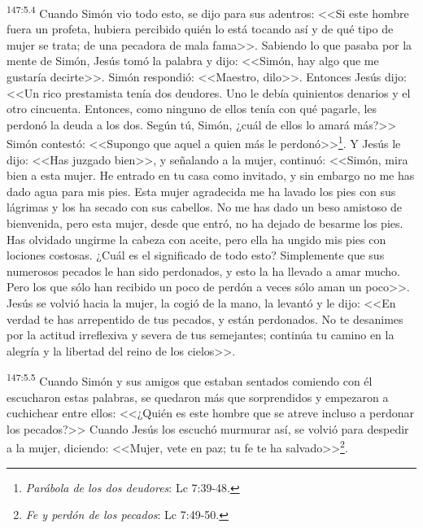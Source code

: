 \par 
\textsuperscript{147:5.4} Cuando Simón vio todo esto, se dijo para sus adentros: <<Si este hombre fuera un profeta, hubiera percibido quién lo está tocando así y de qué tipo de mujer se trata; de una pecadora de mala fama>>. Sabiendo lo que pasaba por la mente de Simón, Jesús tomó la palabra y dijo: <<Simón, hay algo que me gustaría decirte>>. Simón respondió: <<Maestro, dilo>>. Entonces Jesús dijo: <<Un rico prestamista tenía dos deudores. Uno le debía quinientos denarios y el otro cincuenta. Entonces, como ninguno de ellos tenía con qué pagarle, les perdonó la deuda a los dos. Según tú, Simón, ¿cuál de ellos lo amará más?>> Simón contestó: <<Supongo que aquel a quien más le perdonó>>\footnote{\textit{Parábola de los dos deudores}: Lc 7:39-48.}. Y Jesús le dijo: <<Has juzgado bien>>, y señalando a la mujer, continuó: <<Simón, mira bien a esta mujer. He entrado en tu casa como invitado, y sin embargo no me has dado agua para mis pies. Esta mujer agradecida me ha lavado los pies con sus lágrimas y los ha secado con sus cabellos. No me has dado un beso amistoso de bienvenida, pero esta mujer, desde que entró, no ha dejado de besarme los pies. Has olvidado ungirme la cabeza con aceite, pero ella ha ungido mis pies con lociones costosas. ¿Cuál es el significado de todo esto? Simplemente que sus numerosos pecados le han sido perdonados, y esto la ha llevado a amar mucho. Pero los que sólo han recibido un poco de perdón a veces sólo aman un poco>>. Jesús se volvió hacia la mujer, la cogió de la mano, la levantó y le dijo: <<En verdad te has arrepentido de tus pecados, y están perdonados. No te desanimes por la actitud irreflexiva y severa de tus semejantes; continúa tu camino en la alegría y la libertad del reino de los cielos>>.

\par 
\textsuperscript{147:5.5} Cuando Simón y sus amigos que estaban sentados comiendo con él escucharon estas palabras, se quedaron más que sorprendidos y empezaron a cuchichear entre ellos: <<¿Quién es este hombre que se atreve incluso a perdonar los pecados?>> Cuando Jesús los escuchó murmurar así, se volvió para despedir a la mujer, diciendo: <<Mujer, vete en paz; tu fe te ha salvado>>\footnote{\textit{Fe y perdón de los pecados}: Lc 7:49-50.}.

